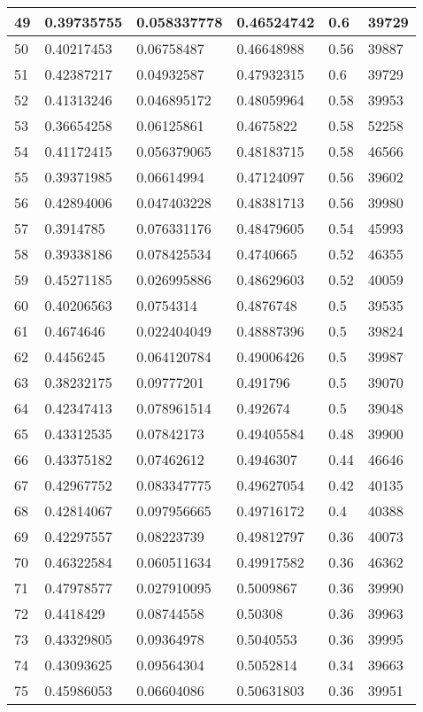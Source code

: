 \begin{longtable}{|l|l|l|l|l|l|}
49 & 0.39735755 & 0.058337778 & 0.46524742 & 0.6 & 39729 \\ \hline 
50 & 0.40217453 & 0.06758487 & 0.46648988 & 0.56 & 39887 \\ \hline 
51 & 0.42387217 & 0.04932587 & 0.47932315 & 0.6 & 39729 \\ \hline 
52 & 0.41313246 & 0.046895172 & 0.48059964 & 0.58 & 39953 \\ \hline 
53 & 0.36654258 & 0.06125861 & 0.4675822 & 0.58 & 52258 \\ \hline 
54 & 0.41172415 & 0.056379065 & 0.48183715 & 0.58 & 46566 \\ \hline 
55 & 0.39371985 & 0.06614994 & 0.47124097 & 0.56 & 39602 \\ \hline 
56 & 0.42894006 & 0.047403228 & 0.48381713 & 0.56 & 39980 \\ \hline 
57 & 0.3914785 & 0.076331176 & 0.48479605 & 0.54 & 45993 \\ \hline 
58 & 0.39338186 & 0.078425534 & 0.4740665 & 0.52 & 46355 \\ \hline 
59 & 0.45271185 & 0.026995886 & 0.48629603 & 0.52 & 40059 \\ \hline 
60 & 0.40206563 & 0.0754314 & 0.4876748 & 0.5 & 39535 \\ \hline 
61 & 0.4674646 & 0.022404049 & 0.48887396 & 0.5 & 39824 \\ \hline 
62 & 0.4456245 & 0.064120784 & 0.49006426 & 0.5 & 39987 \\ \hline 
63 & 0.38232175 & 0.09777201 & 0.491796 & 0.5 & 39070 \\ \hline 
64 & 0.42347413 & 0.078961514 & 0.492674 & 0.5 & 39048 \\ \hline 
65 & 0.43312535 & 0.07842173 & 0.49405584 & 0.48 & 39900 \\ \hline 
66 & 0.43375182 & 0.07462612 & 0.4946307 & 0.44 & 46646 \\ \hline 
67 & 0.42967752 & 0.083347775 & 0.49627054 & 0.42 & 40135 \\ \hline 
68 & 0.42814067 & 0.097956665 & 0.49716172 & 0.4 & 40388 \\ \hline 
69 & 0.42297557 & 0.08223739 & 0.49812797 & 0.36 & 40073 \\ \hline 
70 & 0.46322584 & 0.060511634 & 0.49917582 & 0.36 & 46362 \\ \hline 
71 & 0.47978577 & 0.027910095 & 0.5009867 & 0.36 & 39990 \\ \hline 
72 & 0.4418429 & 0.08744558 & 0.50308 & 0.36 & 39963 \\ \hline 
73 & 0.43329805 & 0.09364978 & 0.5040553 & 0.36 & 39995 \\ \hline 
74 & 0.43093625 & 0.09564304 & 0.5052814 & 0.34 & 39663 \\ \hline 
75 & 0.45986053 & 0.06604086 & 0.50631803 & 0.36 & 39951 \\ \hline 
\end{longtable}